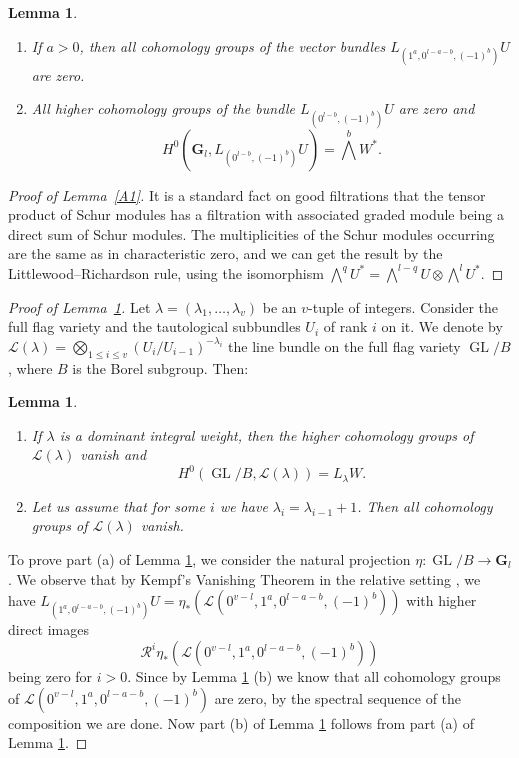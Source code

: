 \documentclass{jams-l}
\newtheorem{lemma}[theorem]{Lemma}
\theoremstyle{definition}
\theoremstyle{remark}
\newcommand{\GG}{{\mathbf G}}
\newcommand{\GL}{{\operatorname{GL}}}
\newcommand{\cal}{\mathcal}
\begin{document}
\begin{lemma}\label {A2} 
\begin{enumerate}
\item[(a)] If  $a>0$, then all cohomology groups of the vector bundles 
$L_{(1^a , 0^{l-a-b},(-1)^b )}{U}$ 
are zero.
\item[(b)] All higher cohomology groups of the bundle 
$L_{( 0^{l-b}, (-1)^b)}{U}$ 
are zero and
\[
H^0 (\GG_l ,L_{( 0^{l-b}, (-1)^b )}{U} )=\bigwedge^b W^*.
\]
\end{enumerate}
\end{lemma}

\begin{proof}[Proof of Lemma~\ref{A1}] 
It is a standard fact on good
filtrations \cite{Donkin 1985} that the tensor product of Schur
modules has a filtration with associated graded module being a direct sum of
Schur modules. The multiplicities of the Schur modules
occurring are the same as in characteristic zero, and we can get the result
by the Littlewood--Richardson rule, using the
isomorphism $\bigwedge^q {U}^* =\bigwedge^{l-q}{U}\otimes
\bigwedge^l {U}^*$.
\end{proof}

\begin{proof}[Proof of Lemma~\ref{A2}] 
Let $\lambda = (\lambda_1 ,\ldots
,\lambda_v )$ be an $v$-tuple of integers. Consider the full
flag variety and the tautological subbundles ${U}_i$ of rank $i$ on it.
We denote by ${\cal L}(\lambda )=
\bigotimes_{1\le i\le v} ({U}_i /{U}_{i-1})^{-\lambda_i}$ 
the line bundle on the full
flag variety ${\GL}/{B}$, where $B$ is the Borel subgroup. Then: 

\begin{lemma}\label {A3} 
\begin{enumerate}
\item[(a)] If $\lambda$ is a dominant integral weight, then the higher
cohomology groups of ${\cal L}(\lambda )$ vanish
and
\[
H^0 ({\GL}/{B} ,{\cal L}(\lambda ))= L_\lambda W.
\]
\item[(b)] Let us assume that for some $i$ we have $\lambda_i=\lambda_{i-1}
+1$. Then all cohomology groups of ${\cal
L}(\lambda )$ vanish.
\end{enumerate}
\end{lemma}

To prove part (a) of Lemma
\ref{A2}, we consider the natural projection 
$\eta: {\GL}/{B}\rightarrow \GG_l$. 
We observe that by Kempf's Vanishing Theorem in the relative
setting \linebreak \cite{Jantzen 1987}, we have
$L_{(1^a , 0^{l-a-b}, (-1)^b )}{U} =\eta_* ({\cal L}(0^{v-l},1^a ,
0^{l-a-b}, (-1)^b )) $  with higher direct images
\[{\cal R}^i\eta_* ({\cal L}(0^{v-l},1^a , 0^{l-a-b}, (-1)^b ))\] being zero
for $i>0$. Since by Lemma \ref{A3} (b) we know that all
cohomology groups of ${\cal L}(0^{v-l},1^a , 0^{l-a-b}, (-1)^b )$ are zero,
by the spectral sequence of the composition we are
done. Now part (b) of Lemma \ref{A2} follows from part (a) of Lemma \ref{A3}.
\end{proof}
\end{document}
